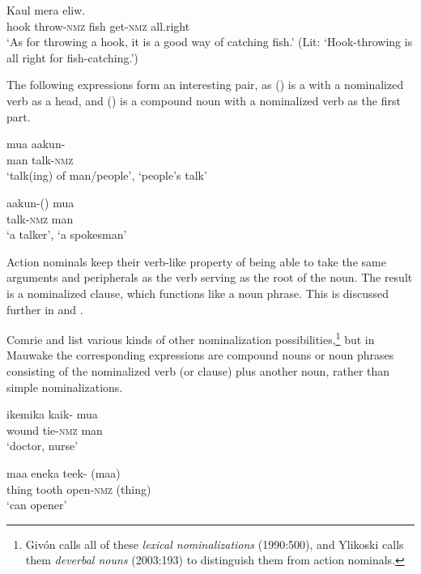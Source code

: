 \ea%
\label{ex:x67}
\gll Kaul   mera  eliw. \\
hook throw-\textsc{nmz} fish get-\textsc{nmz} all.right\\
\glt`As for throwing a hook, it is a good way of catching fish.' (Lit: `Hook-throwing is all right for fish-catching.') 
\z 

The following expressions form an interesting pair, as () is a  with a nominalized verb as a head, and () is a compound noun with a nominalized verb as the first part.

\ea%
\label{ex:x424}
\gll mua aakun- \\
man talk-\textsc{nmz}\\
\glt`talk(ing) of man/people', `people's talk'
\z

\ea%
\label{ex:x425}
\gll aakun-() mua \\
talk-\textsc{nmz} man\\
\glt`a talker', `a spokesman'
\z

Action nominals keep their verb-like property of being able to take the same arguments and peripherals as the verb serving as the root of the noun. The result is a nominalized clause, which functions like a noun phrase. This is discussed further in  and .

Comrie and \citet[334--342]{Thompson2007} list various kinds of other nominalization possibilities,\footnote{Giv\'on calls all of these \textit{lexical nominalizations} (1990:500), and Ylikoski calls them \textit{deverbal nouns} (2003:193) to distinguish them from action nominals.} but in Mauwake the corresponding expressions are compound nouns or noun phrases consisting of the nominalized verb (or clause) plus another noun, rather than simple nominalizations. 

\ea%
\label{ex:x1232}
\gll ikemika kaik- mua \\
wound tie-\textsc{nmz} man\\
\glt`doctor, nurse'
\z

\ea%
\label{ex:x1233}
\gll maa eneka teek- (maa)\footnotemark{} \\
thing tooth open-\textsc{nmz} (thing)\\
\glt`can opener'
\z

